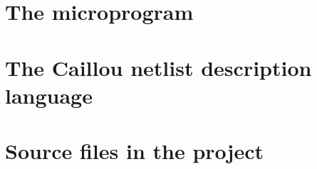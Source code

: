 \documentclass[a4paper, 11pt]{article}
\begin{document}
\section{The microprogram}


\section{The Caillou netlist description language}


\section{Source files in the project}







\end{document}
